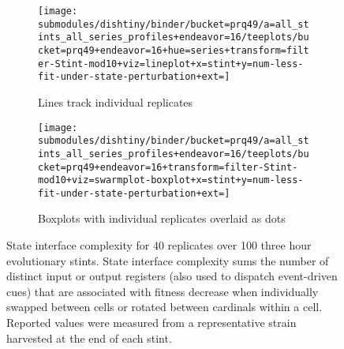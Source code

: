 \begin{figure}
\begin{center}

\begin{subfigure}[b]{\textwidth}
\centering
\texttt{[image: submodules/dishtiny/binder/bucket=prq49/a=all\_stints\_all\_series\_profiles+endeavor=16/teeplots/bucket=prq49+endeavor=16+hue=series+transform=filter-Stint-mod10+viz=lineplot+x=stint+y=num-less-fit-under-state-perturbation+ext=]}%
\caption{
Lines track individual replicates
}
\label{fig:state-interface-complexity-vs-stint-lineplot}
\end{subfigure}

\begin{subfigure}[b]{\columnwidth}
\centering
\texttt{[image: submodules/dishtiny/binder/bucket=prq49/a=all\_stints\_all\_series\_profiles+endeavor=16/teeplots/bucket=prq49+endeavor=16+transform=filter-Stint-mod10+viz=swarmplot-boxplot+x=stint+y=num-less-fit-under-state-perturbation+ext=]}
\caption{
Boxplots with individual replicates overlaid as dots
}
\label{fig:state-interface-complexity-vs-stint-boxplot}
\end{subfigure}

\caption{
State interface complexity for 40 replicates over 100 three hour evolutionary stints.
State interface complexity sums the number of distinct input or output registers (also used to dispatch event-driven cues) that are associated with fitness decrease when individually swapped between cells or rotated between cardinals within a cell.
Reported values were measured from a representative strain harvested at the end of each stint.
}
\label{fig:state-interface-complexity-vs-stint}

\end{center}
\end{figure}
